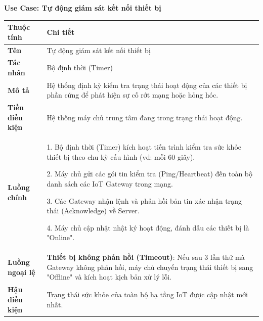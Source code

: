 \noindent \textbf{Use Case: Tự động giám sát kết nối thiết bị} \\
\renewcommand{\arraystretch}{1.6}
\begin{xltabular}{\textwidth}{|l|X|}
\hline
\textbf{Thuộc tính} & \textbf{Chi tiết} \\
\hline
\textbf{Tên} & Tự động giám sát kết nối thiết bị  \\
\hline
\textbf{Tác nhân} & Bộ định thời (Timer) \\
\hline
\textbf{Mô tả} & Hệ thống định kỳ kiểm tra trạng thái hoạt động của các thiết bị phần cứng để phát hiện sự cố rớt mạng hoặc hỏng hóc. \\
\hline
\textbf{Tiền điều kiện} & Hệ thống máy chủ trung tâm đang trong trạng thái hoạt động. \\
\hline
\textbf{Luồng chính} & 
1. Bộ định thời (Timer) kích hoạt tiến trình kiểm tra sức khỏe thiết bị theo chu kỳ cấu hình (vd: mỗi 60 giây).

2. Máy chủ gửi các gói tin kiểm tra (Ping/Heartbeat) đến toàn bộ danh sách các IoT Gateway trong mạng.

3. Các Gateway nhận lệnh và phản hồi bản tin xác nhận trạng thái (Acknowledge) về Server.

4. Máy chủ cập nhật nhật ký hoạt động, đánh dấu các thiết bị là "Online".\\
\hline

\textbf{Luồng ngoại lệ} & 
\textbf{Thiết bị không phản hồi (Timeout)}: Nếu sau 3 lần thử mà Gateway không phản hồi, máy chủ chuyển trạng thái thiết bị sang "Offline" và kích hoạt kịch bản xử lý lỗi.\\
\hline

\textbf{Hậu điều kiện} & Trạng thái sức khỏe của toàn bộ hạ tầng IoT được cập nhật mới nhất. \\
\hline
\end{xltabular}

